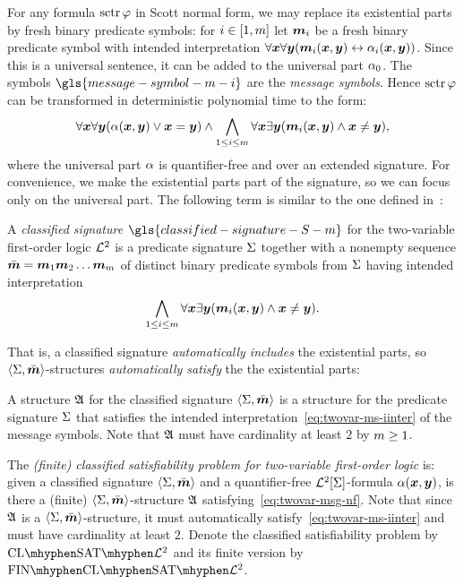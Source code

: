 For any formula $\operatorname{sctr}\varphi$ in Scott normal form, we may replace its
existential parts by fresh binary predicate symbols:
for $i \in [1,m]$ let $\bm{m}_{i}$ be a fresh binary predicate symbol with
intended interpretation
$\forall\bm{x}\forall\bm{y} (\bm{m}_{i}(\bm{x},\bm{y}) \leftrightarrow \alpha_{i}(\bm{x},\bm{y}))$.
Since this is a universal sentence, it can be added to the universal part
$\alpha_{0}$.
The symbols $\gls{message-symbol-m-i}$ are the \emph{message symbols}.
Hence $\operatorname{sctr}\varphi$ can be transformed in deterministic polynomial time to the
form:
\begin{equation}\label{eq:twovar-msg-nf}
  \forall\xx\forall\yy (\falp(\xx,\yy) \lor \xx = \yy) \land
  \bigwedge_{1 \leq \ii \leq \nm} \forall\xx\exists\yy
  (\smm\ii(\xx,\yy) \land \xx \neq \yy),
\end{equation}
where the universal part $\alpha$ is quantifier-free and over an extended
signature.
For convenience, we make the existential parts part of the signature, so we can
focus only on the universal part.
The following term is similar to the one defined in~\cite{MALQ:MALQ201400102}:
\begin{definition}
A \emph{classified signature} $\gls{classified-signature-S-m}$ for the
two-variable first-order logic $\mathcal{L}^{2}$ is a predicate signature $\mathrm{\Sigma}$ together
with a nonempty sequence $\sms = \smm1\smm2\dots\smm\nm$ of distinct binary
predicate symbols from $\mathrm{\Sigma}$ having intended interpretation
\begin{equation}\label{eq:twovar-ms-iinter}
  \bigwedge_{1 \leq \ii \leq \nm} \forall\xx\exists\yy 
  (\smm\ii(\xx,\yy) \land \xx \neq \yy).
\end{equation}
\end{definition}
That is, a classified signature \emph{automatically includes} the
existential parts, so $\left\langle \mathrm{\Sigma},\bar{\bm{m}} \right\rangle$-structures \emph{automatically satisfy}
the the existential parts:
\begin{definition}
A structure $\mathfrak{A}$ for the classified signature $\left\langle \mathrm{\Sigma},\bar{\bm{m}} \right\rangle$ is a
structure for the predicate signature $\mathrm{\Sigma}$ that satisfies the intended
interpretation~\cref{eq:twovar-ms-iinter} of the message symbols.
Note that $\mathfrak{A}$ must have cardinality at least $2$ by $m \geq 1$.
\end{definition}

\begin{definition}\label{def:clsig-twovar}
The \emph{(finite) classified satisfiability problem for two-variable
first-order logic} is:
given a classified signature $\left\langle \mathrm{\Sigma},\bar{\bm{m}} \right\rangle$ and a quantifier-free
$\mathcal{L}^{2}[\mathrm{\Sigma}]$-formula $\alpha(\bm{x},\bm{y})$, is there a (finite)
$\left\langle \mathrm{\Sigma},\bar{\bm{m}} \right\rangle$-structure $\mathfrak{A}$ satisfying~\cref{eq:twovar-msg-nf}.
Note that since $\mathfrak{A}$ is a $\left\langle \mathrm{\Sigma},\bar{\bm{m}} \right\rangle$-structure, it must automatically
satisfy~\cref{eq:twovar-ms-iinter} and must have cardinality at least $2$.
Denote the classified satisfiability problem by $\ClSat{\vFo2}$ and its finite
version by $\FinClSat{\vFo2}$.
\end{definition}

